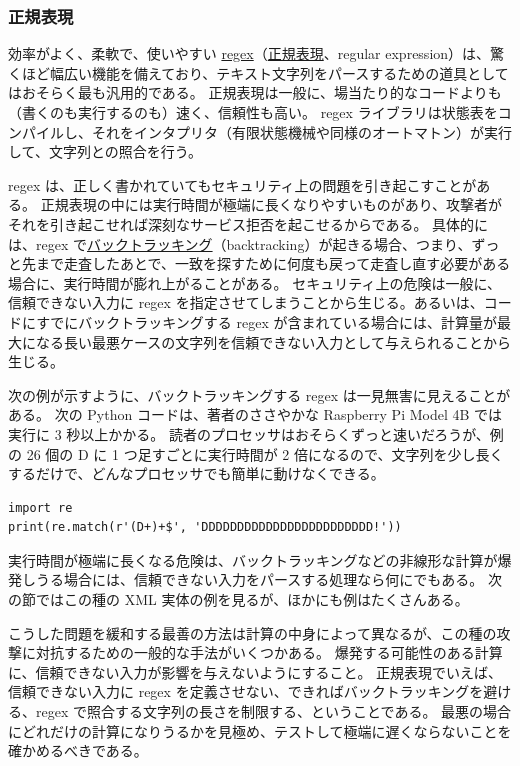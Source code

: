 \documentclass[uplatex]{jsarticle}
\def\label#1{}%
\begin{document}
\subsubsection{正規表現}

効率がよく、柔軟で、使いやすい \underline{regex}（\underline{正規表現}、regular expression）は、驚くほど幅広い機能を備えており、テキスト文字列をパースするための道具としてはおそらく最も汎用的である。
正規表現は一般に、場当たり的なコードよりも（書くのも実行するのも）速く、信頼性も高い。
regex ライブラリは状態表をコンパイルし、それをインタプリタ（有限状態機械や同様のオートマトン）が実行して、文字列との照合を行う。

regex は、正しく書かれていてもセキュリティ上の問題を引き起こすことがある。
正規表現の中には実行時間が極端に長くなりやすいものがあり、攻撃者がそれを引き起こせれば深刻なサービス拒否を起こせるからである。
具体的には、regex で\underline{バックトラッキング}（backtracking）が起きる場合、つまり、ずっと先まで走査したあとで、一致を探すために何度も戻って走査し直す必要がある場合に、実行時間が膨れ上がることがある。
セキュリティ上の危険は一般に、信頼できない入力に regex を指定させてしまうことから生じる。あるいは、コードにすでにバックトラッキングする regex が含まれている場合には、計算量が最大になる長い最悪ケースの文字列を信頼できない入力として与えられることから生じる。

\begin{exa}[バックトラッキングする正規表現]\label{exa:ch10-backtracking-regex}
次の例が示すように、バックトラッキングする regex は一見無害に見えることがある。
次の Python コードは、著者のささやかな Raspberry Pi Model 4B では実行に 3 秒以上かかる。
読者のプロセッサはおそらくずっと速いだろうが、例の 26 個の D に 1 つ足すごとに実行時間が 2 倍になるので、文字列を少し長くするだけで、どんなプロセッサでも簡単に動けなくできる。
\begin{verbatim}
import re
print(re.match(r'(D+)+$', 'DDDDDDDDDDDDDDDDDDDDDDDD!'))
\end{verbatim}
\end{exa}

実行時間が極端に長くなる危険は、バックトラッキングなどの非線形な計算が爆発しうる場合には、信頼できない入力をパースする処理なら何にでもある。
次の節ではこの種の XML 実体の例を見るが、ほかにも例はたくさんある。

こうした問題を緩和する最善の方法は計算の中身によって異なるが、この種の攻撃に対抗するための一般的な手法がいくつかある。
爆発する可能性のある計算に、信頼できない入力が影響を与えないようにすること。
正規表現でいえば、信頼できない入力に regex を定義させない、できればバックトラッキングを避ける、regex で照合する文字列の長さを制限する、ということである。
最悪の場合にどれだけの計算になりうるかを見極め、テストして極端に遅くならないことを確かめるべきである。
\end{document}
